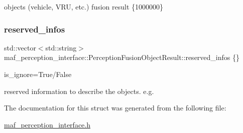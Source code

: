 objects (vehicle, V\+RU, etc.) fusion result \{1000000\} 

\mbox{\label{structmaf__perception__interface_1_1PerceptionFusionObjectResult_aa973ab4f48c216231d77fe7c9bf8c3bd}} 
\subsubsection{\texorpdfstring{reserved\+\_\+infos}{reserved\_infos}}
{\footnotesize\ttfamily std\+::vector$<$std\+::string$>$ maf\+\_\+perception\+\_\+interface\+::\+Perception\+Fusion\+Object\+Result\+::reserved\+\_\+infos \{\}}



is\+\_\+ignore=True/\+False 

reserved information to describe the objects. e.\+g. 

The documentation for this struct was generated from the following file\+:\begin{DoxyCompactItemize}
\item 
\hyperlink{maf__perception__interface_8h}{maf\+\_\+perception\+\_\+interface.\+h}\end{DoxyCompactItemize}
